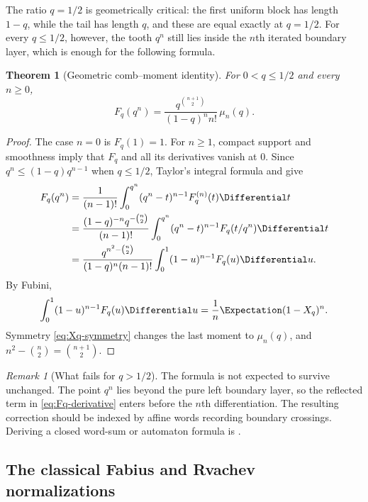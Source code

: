 \documentclass[11pt,a4paper,oneside]{article}
\newtheorem{theorem}{Theorem}[section]
\theoremstyle{definition}
\theoremstyle{remark}
\newtheorem{remark}[remark]{Remark}
\begin{document}
The ratio $q=1/2$ is geometrically critical: the first uniform block has
length $1-q$, while the tail has length $q$, and these are equal exactly at
$q=1/2$.  For every $q\le1/2$, however, the tooth $q^n$ still lies inside the
$n$th iterated boundary layer, which is enough for the following formula.

\begin{theorem}[Geometric comb--moment identity]
\label{thm:comb-moment}
For $0<q\le1/2$ and every $n\ge0$,
\begin{equation}
 F_q(q^n)
 =\frac{q^{\binom{n+1}{2}}}{(1-q)^n n!}\,\mu_n(q).
 \label{eq:comb-moment}
\end{equation}
\end{theorem}

\begin{proof}
The case $n=0$ is $F_q(1)=1$.  For $n\ge1$, compact support and smoothness
imply that $F_q$ and all its derivatives vanish at $0$.  Since
$q^n\le(1-q)q^{n-1}$ when $q\le1/2$, Taylor's integral formula and
 give
\begin{align*}
 F_q(q^n)
 &=\frac1{(n-1)!}\int_0^{q^n}(q^n-t)^{n-1}F_q^{(n)}(t)\Differential t\\
 &=\frac{(1-q)^{-n}q^{-\binom n2}}{(n-1)!}
   \int_0^{q^n}(q^n-t)^{n-1}F_q(t/q^n)\Differential t\\
 &=\frac{q^{n^2-\binom n2}}{(1-q)^n(n-1)!}
   \int_0^1(1-u)^{n-1}F_q(u)\Differential u.
\end{align*}
By Fubini,
\[
 \int_0^1(1-u)^{n-1}F_q(u)\Differential u
 =\frac1n\Expectation(1-X_q)^n.
\]
Symmetry \eqref{eq:Xq-symmetry} changes the last moment to $\mu_n(q)$, and
$n^2-\binom n2=\binom{n+1}{2}$.
\end{proof}

\begin{remark}[What fails for $q>1/2$]
The formula is not expected to survive unchanged.  The point $q^n$ lies beyond
the pure left boundary layer, so the reflected term in
\eqref{eq:Fq-derivative} enters before the $n$th differentiation.  The
resulting correction should be indexed by affine words recording boundary
crossings.  Deriving a closed word-sum or automaton formula is
.
\end{remark}

\subsection{The classical Fabius and Rvachev normalizations}
\end{document}
